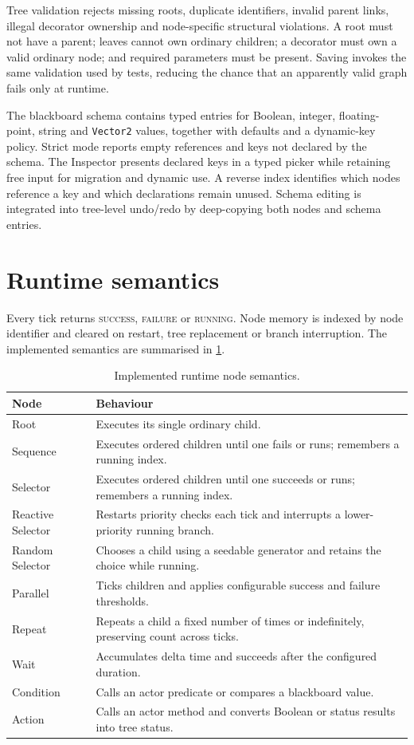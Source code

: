 Tree validation rejects missing roots, duplicate identifiers, invalid parent links, illegal decorator ownership and node-specific structural violations. A root must not have a parent; leaves cannot own ordinary children; a decorator must own a valid ordinary node; and required parameters must be present. Saving invokes the same validation used by tests, reducing the chance that an apparently valid graph fails only at runtime.

The blackboard schema contains typed entries for Boolean, integer, floating-point, string and \texttt{Vector2} values, together with defaults and a dynamic-key policy. Strict mode reports empty references and keys not declared by the schema. The Inspector presents declared keys in a typed picker while retaining free input for migration and dynamic use. A reverse index identifies which nodes reference a key and which declarations remain unused. Schema editing is integrated into tree-level undo/redo by deep-copying both nodes and schema entries.

\section{Runtime semantics}

Every tick returns \textsc{success}, \textsc{failure} or \textsc{running}. Node memory is indexed by node identifier and cleared on restart, tree replacement or branch interruption. The implemented semantics are summarised in \cref{tab:nodes}.

\begin{table}[htbp]
\centering
\caption{Implemented runtime node semantics.}
\label{tab:nodes}
\begin{tabular}{p{}p{}}
\toprule
Node & Behaviour \\
\midrule
Root & Executes its single ordinary child. \\
Sequence & Executes ordered children until one fails or runs; remembers a running index. \\
Selector & Executes ordered children until one succeeds or runs; remembers a running index. \\
Reactive Selector & Restarts priority checks each tick and interrupts a lower-priority running branch. \\
Random Selector & Chooses a child using a seedable generator and retains the choice while running. \\
Parallel & Ticks children and applies configurable success and failure thresholds. \\
Repeat & Repeats a child a fixed number of times or indefinitely, preserving count across ticks. \\
Wait & Accumulates delta time and succeeds after the configured duration. \\
Condition & Calls an actor predicate or compares a blackboard value. \\
Action & Calls an actor method and converts Boolean or status results into tree status. \\
\bottomrule
\end{tabular}
\end{table}

